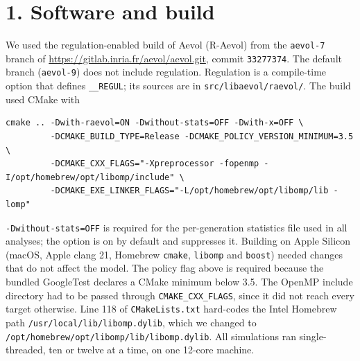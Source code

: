 


\section*{1. Software and build}
We used the regulation-enabled build of Aevol (R-Aevol) from the \texttt{aevol-7}
branch of \url{https://gitlab.inria.fr/aevol/aevol.git}, commit \texttt{33277374}.
The default branch (\texttt{aevol-9}) does not include regulation. Regulation is a
compile-time option that defines \texttt{\_\_REGUL}; its sources are in
\texttt{src/libaevol/raevol/}. The build used CMake with
\begin{lstlisting}
cmake .. -Dwith-raevol=ON -Dwithout-stats=OFF -Dwith-x=OFF \
         -DCMAKE_BUILD_TYPE=Release -DCMAKE_POLICY_VERSION_MINIMUM=3.5 \
         -DCMAKE_CXX_FLAGS="-Xpreprocessor -fopenmp -I/opt/homebrew/opt/libomp/include" \
         -DCMAKE_EXE_LINKER_FLAGS="-L/opt/homebrew/opt/libomp/lib -lomp"
\end{lstlisting}
\texttt{-Dwithout-stats=OFF} is required for the per-generation statistics file
used in all analyses; the option is on by default and suppresses it. Building on
Apple Silicon (macOS, Apple clang 21, Homebrew \texttt{cmake}, \texttt{libomp} and \texttt{boost}) needed changes that do not affect the model. The policy flag above is required because the bundled GoogleTest declares a CMake minimum below 3.5. The OpenMP include directory had to be passed through \texttt{CMAKE\_CXX\_FLAGS}, since it did not reach every target otherwise. Line 118 of \texttt{CMakeLists.txt} hard-codes the Intel Homebrew path \texttt{/usr/local/lib/libomp.dylib}, which we changed to \texttt{/opt/homebrew/opt/libomp/lib/libomp.dylib}.
All simulations ran single-threaded, ten or twelve at a time, on one 12-core
machine.


